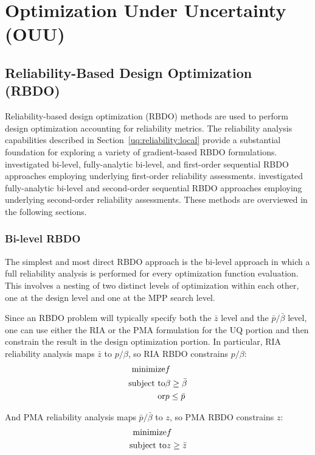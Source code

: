 \chapter{Optimization Under Uncertainty (OUU)}\label{ouu}

\section{Reliability-Based Design Optimization (RBDO)}\label{ouu:rbdo}

Reliability-based design optimization (RBDO) methods are used to
perform design optimization accounting for reliability metrics.  The
reliability analysis capabilities described in
Section~\ref{uq:reliability:local} provide a substantial foundation
for exploring a variety of gradient-based RBDO formulations.
\cite{firstorder} investigated bi-level, fully-analytic bi-level, and
first-order sequential RBDO approaches employing underlying
first-order reliability assessments.  \cite{secondorder} investigated
fully-analytic bi-level and second-order sequential RBDO approaches
employing underlying second-order reliability assessments.  These
methods are overviewed in the following sections.

\subsection{Bi-level RBDO} \label{ouu:rbdo:bilev}

The simplest and most direct RBDO approach is the bi-level approach in
which a full reliability analysis is performed for every optimization
function evaluation.  This involves a nesting of two distinct levels
of optimization within each other, one at the design level and one at
the MPP search level.

Since an RBDO problem will typically specify both the $\bar{z}$ level
and the $\bar{p}/\bar{\beta}$ level, one can use either the RIA or the
PMA formulation for the UQ portion and then constrain the result in
the design optimization portion.  In particular, RIA reliability
analysis maps $\bar{z}$ to $p/\beta$, so RIA RBDO constrains $p/\beta$:
\begin{eqnarray}
  {\rm minimize }     & f \nonumber \\
  {\rm subject \ to } & \beta \ge \bar{\beta} \nonumber \\
  {\rm or }           & p \le \bar{p} \label{eq:rbdo_ria}
\end{eqnarray}

\noindent And PMA reliability analysis maps $\bar{p}/\bar{\beta}$ to 
$z$, so PMA RBDO constrains $z$:
\begin{eqnarray}
  {\rm minimize }     & f \nonumber \\
  {\rm subject \ to } & z \ge \bar{z} \label{eq:rbdo_pma}
\end{eqnarray}

